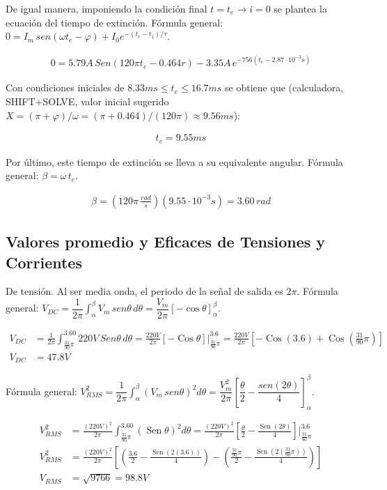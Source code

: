 \documentclass[11pt]{article}
\newcommand{\Sen}{\operatorname{Sen}}
\newcommand{\Cos}{\operatorname{Cos}}
\begin{document}
De igual manera, imponiendo la condici\'on final $t=t_e \rightarrow i=0$ se
plantea la ecuaci\'on del tiempo de extinci\'on. F\'ormula general:
$0 = I_m\,sen(\omega t_e - \varphi) + I_0 e^{-(t_e-t_1)/\tau}$.

\begin{align*}
0 = 5.79A\,Sen(120\pi t_e - 0.464r) - 3.35A\,e^{-756(t_e-2.87\cdot10^{-3}s)}
\end{align*}

Con condiciones iniciales de $8.33ms \le t_e \le 16.7ms$ se obtiene que
(calculadora, SHIFT+SOLVE, valor inicial sugerido
$X = (\pi+\varphi)/\omega = (\pi + 0.464)/(120\pi) \approx 9.56ms$):

\begin{align*}
t_e = \boxed{9.55ms}
\end{align*}

Por \'ultimo, este tiempo de extinci\'on se lleva a su equivalente angular.
F\'ormula general: $\beta = \omega\,t_e$.

\begin{align*}
\beta = (120\pi\,\tfrac{rad}{s})(9.55\cdot10^{-3}s) = \boxed{3.60\,rad}
\end{align*}

\subsection{Valores promedio y Eficaces de Tensiones y Corrientes}

De tensi\'on. Al ser media onda, el periodo de la se\~nal de salida es $2\pi$.
F\'ormula general:
$V_{DC} = \dfrac{1}{2\pi}\displaystyle\int_{\alpha}^{\beta} V_m\,sen\theta\,d\theta
= \dfrac{V_m}{2\pi}\left[-\cos\theta\right]_{\alpha}^{\beta}$.

\begin{align*}
V_{DC} &= \frac{1}{2\pi}\int_{\frac{31}{90}\pi}^{3.60} 220V\,Sen\theta\,d\theta
= \frac{220V}{2\pi}\left[-\Cos\theta\right]\Big|_{\frac{31}{90}\pi}^{3.6}
= \frac{220V}{2\pi}\left[-\Cos(3.6)+\Cos\!\left(\tfrac{31}{90}\pi\right)\right] \\
V_{DC} &= \boxed{47.8V}
\end{align*}

F\'ormula general:
$V_{RMS}^2 = \dfrac{1}{2\pi}\displaystyle\int_{\alpha}^{\beta} (V_m\,sen\theta)^2 d\theta
= \dfrac{V_m^2}{2\pi}\left[\dfrac{\theta}{2}-\dfrac{sen(2\theta)}{4}\right]_{\alpha}^{\beta}$.

\begin{align*}
V_{RMS}^2 &= \frac{(220V)^2}{2\pi}\int_{\frac{31}{90}\pi}^{3.60}(\Sen\theta)^2 d\theta
= \frac{(220V)^2}{2\pi}\left[\frac{\theta}{2}-\frac{\Sen(2\theta)}{4}\right]\Bigg|_{\frac{31}{90}\pi}^{3.6} \\
V_{RMS}^2 &= \frac{(220V)^2}{2\pi}\left[\left(\frac{3.6}{2}-\frac{\Sen(2(3.6))}{4}\right)-\left(\frac{\frac{31}{90}\pi}{2}-\frac{\Sen(2(\frac{31}{90}\pi))}{4}\right)\right] \\
V_{RMS} &= \sqrt{9766} = \boxed{98.8V}
\end{align*}
\end{document}
